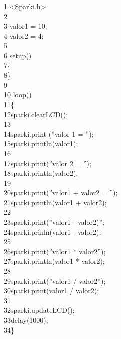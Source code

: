 \documentclass[conference]{IEEEtran}
\begin{document}
    {\selectfont 
    {\color{cinza}1} <Sparki.h>\\
    {\color{cinza}2}\\
    {\color{cinza}3} valor1 = 10;\\
    {\color{cinza}4} valor2 = 4;\\
    {\color{cinza}5}\\
    {\color{cinza}6} setup()\\
    {\color{cinza}7}\quad\{\\
    {\color{cinza}8}\quad\}\\
    {\color{cinza}9}\\
    {\color{cinza}10} loop()\\
    {\color{cinza}11}\quad\{\\
    {\color{cinza}12}\quad\quad sparki.clearLCD();\\
    {\color{cinza}13}\\
    {\color{cinza}14}\quad\quad sparki.print ({\color{verde}''valor 1 = ''});\\
    {\color{cinza}15}\quad\quad sparki.println(valor1);\\
    {\color{cinza}16}\\
    {\color{cinza}17}\quad\quad sparki.print({\color{verde}''valor 2 = ''});\\
    {\color{cinza}18}\quad\quad sparki.println(valor2);\\
    {\color{cinza}19}\\
    {\color{cinza}20}\quad\quad sparki.print({\color{verde}''valor1 + valor2 = ''});\\
    {\color{cinza}21}\quad\quad sparki.println(valor1 + valor2);\\
    {\color{cinza}22}\\
    {\color{cinza}23}\quad\quad sparki.print({\color{verde}''valor1 - valor2)''};\\
    {\color{cinza}24}\quad\quad sparki.prinln(valor1 - valor2);\\
    {\color{cinza}25}\\
    {\color{cinza}26}\quad\quad sparki.print({\color{verde}''valor1 * valor2''});\\
    {\color{cinza}27}\quad\quad sparki.println(valor1 * valor2);\\
    {\color{cinza}28}\\
    {\color{cinza}29}\quad\quad sparki.print({\color{verde}''valor1 / valor2''});\\
    {\color{cinza}30}\quad\quad sparki.print(valor1 / valor2);\\
    {\color{cinza}31}\\
    {\color{cinza}32}\quad\quad sparki.updateLCD();\\
    {\color{cinza}33}\quad\quad delay(1000);\\
    {\color{cinza}34}\quad\}}
\end{document}
